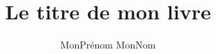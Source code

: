 \title{Le titre de mon livre}
\author{MonPrénom MonNom}

\newcommand\dedicace{Je dédie ce travail\\à tous ceux qui le méritent}
%
\newcommand\epigraphe{Science sans conscience n'est que ruine de l'âme}
\newcommand\AuteurEpigraphe{François \bsc{Rabelais}}

